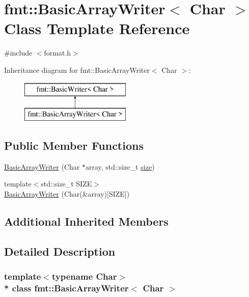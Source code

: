 \hypertarget{classfmt_1_1BasicArrayWriter}{}\section{fmt\+:\+:Basic\+Array\+Writer$<$ Char $>$ Class Template Reference}
\label{classfmt_1_1BasicArrayWriter}


{\ttfamily \#include $<$format.\+h$>$}

Inheritance diagram for fmt\+:\+:Basic\+Array\+Writer$<$ Char $>$\+:\begin{figure}[H]
\begin{center}
\leavevmode
\includegraphics[height=2.000000cm]{classfmt_1_1BasicArrayWriter}
\end{center}
\end{figure}
\subsection*{Public Member Functions}
\begin{DoxyCompactItemize}
\item 
\hyperlink{classfmt_1_1BasicArrayWriter_a7559ecce2ffb3ecbb275dac5d2cc05e9}{Basic\+Array\+Writer} (Char $\ast$array, std\+::size\+\_\+t \hyperlink{classfmt_1_1BasicWriter_a1b6721b4ba4d3fa18ac781a36616cc2a}{size})
\item 
{\footnotesize template$<$std\+::size\+\_\+t S\+I\+ZE$>$ }\\\hyperlink{classfmt_1_1BasicArrayWriter_ab8787cfc9b1500c0f2765074f64e5088}{Basic\+Array\+Writer} (Char(\&array)\mbox{[}S\+I\+ZE\mbox{]})
\end{DoxyCompactItemize}
\subsection*{Additional Inherited Members}


\subsection{Detailed Description}
\subsubsection*{template$<$typename Char$>$\\*
class fmt\+::\+Basic\+Array\+Writer$<$ Char $>$}


